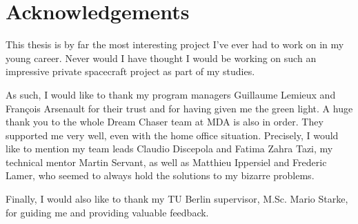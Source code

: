 \chapter*{Acknowledgements}\label{cha:ack}
This thesis is by far the most interesting project I've ever had to work on in my young career. Never would I have thought I would be working on such an impressive private spacecraft project as part of my studies. 

As such, I would like to thank my program managers Guillaume Lemieux and François Arsenault for their trust and for having given me the green light. A huge thank you to the whole Dream Chaser team at MDA is also in order. They supported me very well, even with the home office situation. Precisely, I would like to mention my team leads Claudio Discepola and Fatima Zahra Tazi, my technical mentor Martin Servant, as well as Matthieu Ippersiel and Frederic Lamer, who seemed to always hold the solutions to my bizarre problems.

Finally, I would also like to thank my TU Berlin supervisor, M.Sc. Mario Starke, for guiding me and providing valuable feedback. 